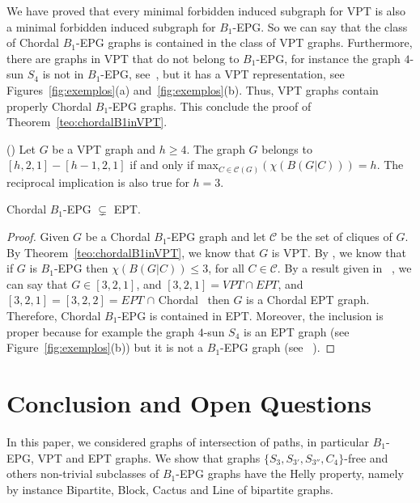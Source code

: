 We have proved that every minimal forbidden induced subgraph for VPT is also a minimal forbidden induced subgraph for $B_1$-EPG. So we can say that the class of Chordal $B_1$-EPG graphs is contained in the class of VPT graphs. Furthermore, there are graphs in VPT that do not belong to $B_1$-EPG, for instance the graph $4$-sun $S_4$ is not in $B_1$-EPG, see~\cite{golumbic2009}, but it has a VPT representation, see Figures~\ref{fig:exemplos}(a) and~\ref{fig:exemplos}(b). Thus, VPT graphs contain properly Chordal $B_1$-EPG graphs. This conclude the proof of Theorem~\ref{teo:chordalB1inVPT}.



\begin{theorem}
(\cite{alcon2014recognizing}) Let $G$ be a VPT graph and $h\geq 4$. The graph $G$ belongs to $[h,2,1]-[h-1,2,1]$ if and only if max$_{C\in\mathcal{C}(G)}(\chi (B(G|C)))=h$. The reciprocal implication is also true for $h=3$.
\end{theorem}


\begin{theorem}\label{teo:b1epgept}
Chordal $B_1$-EPG $\subsetneq$ EPT. 
\end{theorem}

\begin{proof}
Given $G$ be a  Chordal $B_1$-EPG graph and let  $\mathcal{C}$  be the set of cliques of $G$. By Theorem~\ref{teo:chordalB1inVPT}, we know that $G$ is VPT. By \cite{golumbic2009}, we know that if $G$ is $B_1$-EPG then $\chi (B(G|C))\leq 3$,  for all $C \in \mathcal{C}$. By a result given in ~\cite{alcon2014recognizing}, we can say that $G \in [3,2,1]$, and $[3,2,1] = VPT \cap EPT$, and $[3,2,1] = [3,2,2] = EPT$ $\cap$ Chordal~\cite{golumbic1985} then $G$ is a Chordal EPT graph. Therefore, Chordal $B_1$-EPG is contained in EPT. Moreover, the inclusion is proper because for example the graph $4$-sun $S_4$ is an EPT graph (see Figure~\ref{fig:exemplos}(b)) but it is not a $B_1$-EPG graph (see ~\cite{golumbic2009}).
 \end{proof} 



\section{Conclusion and Open Questions}

In this paper, we considered graphs of intersection of paths, in particular $B_1$-EPG, VPT and EPT graphs. We show that graphs $\{S_3, S_{3'},S_{3''},C_4\}$-free and others non-trivial subclasses of  $B_1$-EPG graphs have the Helly property, namely by instance Bipartite, Block, Cactus and Line of bipartite graphs. 
  
